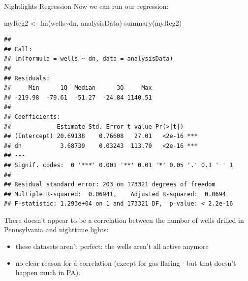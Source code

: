 \documentclass[
  ignorenonframetext,
]{beamer}
\newenvironment{Shaded}{\begin{snugshade}}{\end{snugshade}}
\newcommand{\FunctionTok}[1]{\textcolor[rgb]{0.00,0.00,0.00}{#1}}
\newcommand{\NormalTok}[1]{#1}
\newcommand{\OtherTok}[1]{\textcolor[rgb]{0.56,0.35,0.01}{#1}}
\newcommand{\SpecialCharTok}[1]{\textcolor[rgb]{0.00,0.00,0.00}{#1}}
\begin{document}
\begin{frame}[fragile]{Nightlights Regression}
\protect\hypertarget{nightlights-regression-2}{}
Now we can run our regression: \tiny

\begin{Shaded}
\begin{Highlighting}[]
\NormalTok{myReg2 }\OtherTok{\textless{}{-}} \FunctionTok{lm}\NormalTok{(wells}\SpecialCharTok{\textasciitilde{}}\NormalTok{dn, analysisData)}
\FunctionTok{summary}\NormalTok{(myReg2)}
\end{Highlighting}
\end{Shaded}

\begin{verbatim}
## 
## Call:
## lm(formula = wells ~ dn, data = analysisData)
## 
## Residuals:
##     Min      1Q  Median      3Q     Max 
## -219.98  -79.61  -51.27  -24.84 1140.51 
## 
## Coefficients:
##             Estimate Std. Error t value Pr(>|t|)    
## (Intercept) 20.69138    0.76608   27.01   <2e-16 ***
## dn           3.68739    0.03243  113.70   <2e-16 ***
## ---
## Signif. codes:  0 '***' 0.001 '**' 0.01 '*' 0.05 '.' 0.1 ' ' 1
## 
## Residual standard error: 203 on 173321 degrees of freedom
## Multiple R-squared:  0.06941,    Adjusted R-squared:  0.0694 
## F-statistic: 1.293e+04 on 1 and 173321 DF,  p-value: < 2.2e-16
\end{verbatim}

\normalsize

There doesn't appear to be a correlation between the number of wells
drilled in Pennsylvania and nighttime lights:

\begin{itemize}
\item
  these datasets aren't perfect; the wells aren't all active anymore
\item
  no clear reason for a correlation (except for gas flaring - but that
  doesn't happen much in PA).
\end{itemize}
\end{frame}
\end{document}
